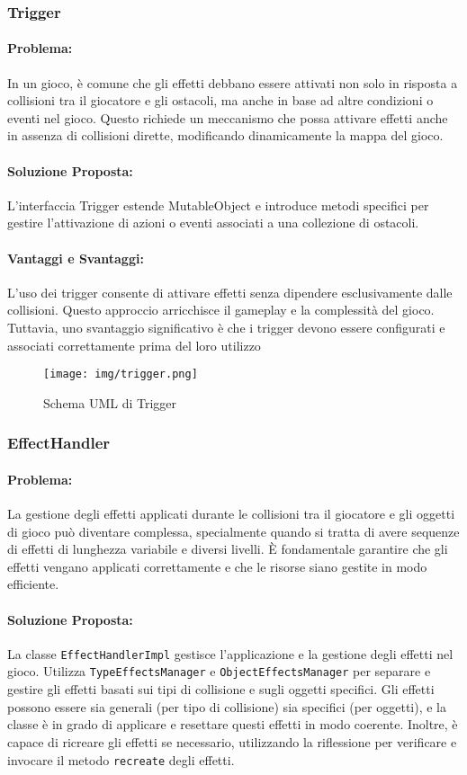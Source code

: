 \documentclass[a4paper,12pt]{report}
\begin{document}
	
	\subsubsection{Trigger}
	\paragraph{Problema:} In un gioco, è comune che gli effetti debbano essere attivati non solo in risposta a collisioni tra il giocatore e gli ostacoli, ma anche in base ad altre condizioni o eventi nel gioco. Questo richiede un meccanismo che possa attivare effetti anche in assenza di collisioni dirette, modificando dinamicamente la mappa del gioco.
	\paragraph{Soluzione Proposta:} L’interfaccia Trigger estende MutableObject e introduce metodi specifici per gestire l’attivazione di azioni o eventi associati a una collezione di ostacoli. 
	\paragraph{Vantaggi e Svantaggi:}
	L’uso dei trigger consente di attivare effetti senza dipendere esclusivamente dalle collisioni. Questo approccio arricchisce il gameplay e la complessità del gioco. Tuttavia, uno svantaggio significativo è che i trigger devono essere configurati e associati correttamente prima del loro utilizzo
	
	\begin{figure}[H]
		\centering
		\texttt{[image: img/trigger.png]}
		\caption{Schema UML di Trigger}
		\label{img:trigger}
	\end{figure}
	
	\subsubsection{EffectHandler}
	\paragraph{Problema:} La gestione degli effetti applicati durante le collisioni tra il giocatore e gli oggetti di gioco può diventare complessa, specialmente quando si tratta di avere sequenze di effetti di lunghezza variabile e diversi livelli. È fondamentale garantire che gli effetti vengano applicati correttamente e che le risorse siano gestite in modo efficiente.
	\paragraph{Soluzione Proposta:} La classe \texttt{EffectHandlerImpl} gestisce l’applicazione e la gestione degli effetti nel gioco. Utilizza \texttt{TypeEffectsManager} e \texttt{ObjectEffectsManager} per separare e gestire gli effetti basati sui tipi di collisione e sugli oggetti specifici. Gli effetti possono essere sia generali (per tipo di collisione) sia specifici (per oggetti), e la classe è in grado di applicare e resettare questi effetti in modo coerente. Inoltre, è capace di ricreare gli effetti se necessario, utilizzando la riflessione per verificare e invocare il metodo \texttt{recreate} degli effetti.
\end{document}
